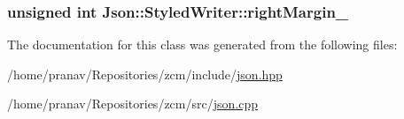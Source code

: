 \subsubsection[{\texorpdfstring{right\+Margin\+\_\+}{rightMargin_}}]{\setlength{\rightskip}{0pt plus 5cm}unsigned int Json\+::\+Styled\+Writer\+::right\+Margin\+\_\+\hspace{0.3cm}{\ttfamily [private]}}\hypertarget{classJson_1_1StyledWriter_ae648d2e1fc0f7d45c748c96805106cb0}{}\label{classJson_1_1StyledWriter_ae648d2e1fc0f7d45c748c96805106cb0}


The documentation for this class was generated from the following files\+:\begin{DoxyCompactItemize}
\item 
/home/pranav/\+Repositories/zcm/include/\hyperlink{json_8hpp}{json.\+hpp}\item 
/home/pranav/\+Repositories/zcm/src/\hyperlink{json_8cpp}{json.\+cpp}\end{DoxyCompactItemize}
